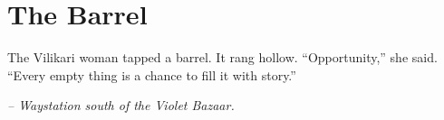 \chapter*{The Barrel}

The Vilikari woman tapped a barrel. It rang hollow. “Opportunity,” she said. “Every empty thing is a chance to fill it with story.”

\smallskip

\noindent \textit{– Waystation south of the Violet Bazaar.}

